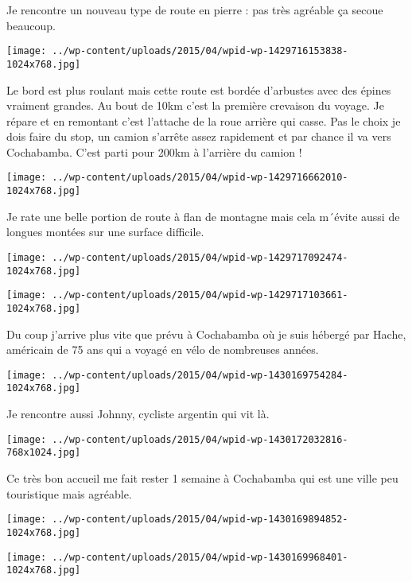 \pagebreak
 Je rencontre un nouveau type de route en pierre : pas très agréable ça secoue beaucoup. 
\begin{center} \texttt{[image: ../wp-content/uploads/2015/04/wpid-wp-1429716153838-1024x768.jpg]} \end{center}

 Le bord est plus roulant mais cette route est bordée d'arbustes avec des épines vraiment grandes. Au bout de 10km c'est la première crevaison du voyage. Je répare et en remontant c'est l'attache de la roue arrière qui casse. 
 Pas le choix je dois faire du stop, un camion s'arrête assez rapidement et par chance il va vers Cochabamba. C'est parti pour 200km à l'arrière du camion ! 
\begin{center} \texttt{[image: ../wp-content/uploads/2015/04/wpid-wp-1429716662010-1024x768.jpg]} \end{center}

 Je rate une belle portion de route à flan de montagne mais cela m´évite aussi de longues montées sur une surface difficile. 
\begin{center} \texttt{[image: ../wp-content/uploads/2015/04/wpid-wp-1429717092474-1024x768.jpg]} \end{center}
\begin{center} \texttt{[image: ../wp-content/uploads/2015/04/wpid-wp-1429717103661-1024x768.jpg]} \end{center}

\pagebreak
 Du coup j'arrive plus vite que prévu à Cochabamba où je suis hébergé par Hache, américain de 75 ans qui a voyagé en vélo de nombreuses années. 
\begin{center} \texttt{[image: ../wp-content/uploads/2015/04/wpid-wp-1430169754284-1024x768.jpg]} \end{center}

 Je rencontre aussi Johnny, cycliste argentin qui vit là. 
\begin{center} \texttt{[image: ../wp-content/uploads/2015/04/wpid-wp-1430172032816-768x1024.jpg]} \end{center}

 Ce très bon accueil me fait rester 1 semaine à Cochabamba qui est une ville peu touristique mais agréable. 
\begin{center} \texttt{[image: ../wp-content/uploads/2015/04/wpid-wp-1430169894852-1024x768.jpg]} \end{center}
\begin{center} \texttt{[image: ../wp-content/uploads/2015/04/wpid-wp-1430169968401-1024x768.jpg]} \end{center}

